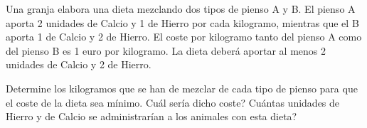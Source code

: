 
Una granja elabora una dieta mezclando dos tipos de pienso A y B. El pienso
A aporta 2 unidades de Calcio y 1 de Hierro por cada kilogramo, mientras
que el B aporta 1 de Calcio y 2 de Hierro. El coste por kilogramo tanto del
pienso A como del pienso B es 1 euro por kilogramo. La dieta deberá aportar
al menos 2 unidades de Calcio y 2 de Hierro.

Determine los kilogramos que se han de mezclar de cada tipo de pienso para
que el coste de la dieta sea mínimo. \textquestiondown{}Cuál sería dicho
coste? \textquestiondown{}Cuántas unidades de Hierro y de Calcio se
administrarían a los animales con esta dieta?
